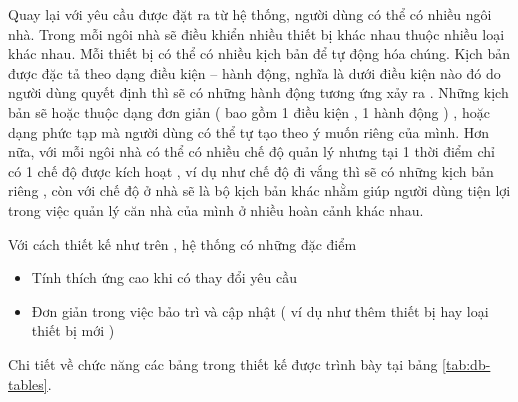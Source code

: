 \documentclass[11pt,a4paper,oneside]{book}
\begin{document}
Quay lại với yêu cầu được đặt ra từ hệ thống, người dùng có thể có nhiều ngôi nhà. Trong mỗi ngôi nhà sẽ điều khiển nhiều thiết bị khác nhau thuộc nhiều loại khác nhau. Mỗi thiết bị có thể có nhiều kịch bản để tự động hóa chúng. Kịch bản được đặc tả theo dạng điều kiện – hành động, nghĩa là dưới điều kiện nào đó do người dùng quyết định thì sẽ có những hành động tương ứng xảy ra . Những kịch bản sẽ hoặc thuộc dạng đơn giản ( bao gồm 1 điều kiện , 1 hành động ) , hoặc dạng phức tạp mà người dùng có thể tự tạo theo ý muốn riêng của mình. Hơn nữa, với mỗi ngôi nhà có thể có nhiều chế độ quản lý nhưng tại 1 thời điểm chỉ có 1 chế độ được kích hoạt , ví dụ như chế độ đi vắng thì sẽ có những kịch bản riêng , còn với chế độ ở nhà sẽ là bộ kịch bản khác nhằm giúp người dùng tiện lợi trong việc quản lý căn nhà của mình ở nhiều hoàn cảnh khác nhau.

Với cách thiết kế như trên , hệ thống có những đặc điểm

\begin{itemize}[topsep=1mm,itemsep=-0.5mm]
\item Tính thích ứng cao khi có thay đổi yêu cầu
\item Đơn giản trong việc bảo trì và cập nhật ( ví dụ như thêm thiết bị hay loại thiết bị mới )
\vspace{1mm}
\end{itemize}

Chi tiết về chức năng các bảng trong thiết kế được trình bày tại bảng \ref{tab:db-tables}.
\end{document}

